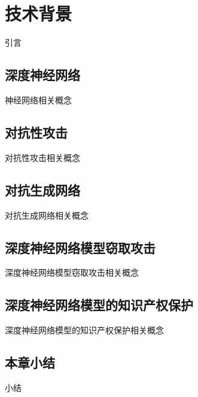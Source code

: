

\chapter{技术背景} 
\label{2}

引言

\section{深度神经网络}

神经网络相关概念

\section{对抗性攻击}


对抗性攻击相关概念


\section{对抗生成网络}
\label{sec:ex:A}

对抗生成网络相关概念


\section{深度神经网络模型窃取攻击}

深度神经网络模型窃取攻击相关概念


\section{深度神经网络模型的知识产权保护}


深度神经网络模型的知识产权保护相关概念


\section{本章小结}
\label{sec:relatedwork:table}

小结
